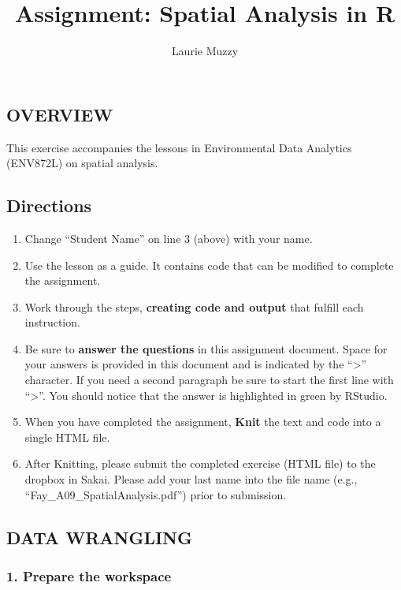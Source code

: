 \documentclass[]{article}
\title{Assignment: Spatial Analysis in R}
\author{Laurie Muzzy}
\date{}
\providecommand{\tightlist}{%
  \setlength{\itemsep}{0pt}\setlength{\parskip}{0pt}}
\begin{document}
\maketitle

{
\setcounter{tocdepth}{2}
\tableofcontents
}
\subsection{OVERVIEW}\label{overview}

This exercise accompanies the lessons in Environmental Data Analytics
(ENV872L) on spatial analysis.

\subsection{Directions}\label{directions}

\begin{enumerate}
\def\labelenumi{\arabic{enumi}.}
\tightlist
\item
  Change ``Student Name'' on line 3 (above) with your name.
\item
  Use the lesson as a guide. It contains code that can be modified to
  complete the assignment.
\item
  Work through the steps, \textbf{creating code and output} that fulfill
  each instruction.
\item
  Be sure to \textbf{answer the questions} in this assignment document.
  Space for your answers is provided in this document and is indicated
  by the ``\textgreater{}'' character. If you need a second paragraph be
  sure to start the first line with ``\textgreater{}''. You should
  notice that the answer is highlighted in green by RStudio.
\item
  When you have completed the assignment, \textbf{Knit} the text and
  code into a single HTML file.
\item
  After Knitting, please submit the completed exercise (HTML file) to
  the dropbox in Sakai. Please add your last name into the file name
  (e.g., ``Fay\_A09\_SpatialAnalysis.pdf'') prior to submission.
\end{enumerate}

\subsection{DATA WRANGLING}\label{data-wrangling}

\subsubsection{1. Prepare the workspace}\label{prepare-the-workspace}
\end{document}
